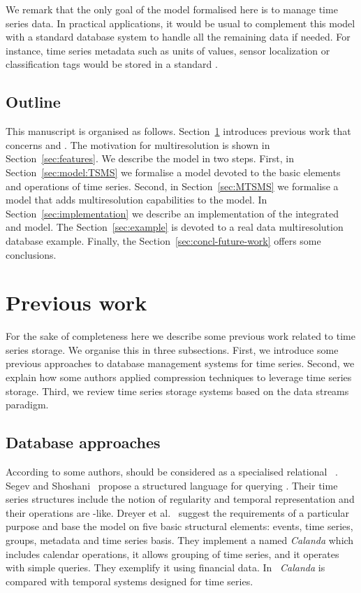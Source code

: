 We remark that the only goal of the model formalised here is to manage
time series data. In practical applications, it would be usual to
complement this model with a standard database system to handle all
the remaining data if needed. For instance, time series metadata such
as units of values, sensor localization or classification tags would
be stored in a standard .

\subsection{Outline}

This manuscript is organised as
follows. Section~\ref{sec:related-work} introduces previous work that
concerns  and .  The motivation for
multiresolution is shown in Section~\ref{sec:features}.  We describe
the model in two steps.  First, in Section~\ref{sec:model:TSMS} we
formalise a  model devoted to the basic elements and
operations of time series.  Second, in Section~\ref{sec:MTSMS} we
formalise a  model that adds multiresolution capabilities
to the  model.  In Section~\ref{sec:implementation} we
describe an implementation of the integrated  and
 model. The Section~\ref{sec:example} is devoted to a real
data multiresolution database example.  Finally,
the Section~\ref{sec:concl-future-work} offers some conclusions.


\section{Previous work}
\label{sec:related-work}

For the sake of completeness here we describe some previous work
related to time series storage. We organise this in three
subsections. First, we introduce some previous approaches to database
management systems for time series. Second, we explain how some
authors applied compression techniques to leverage time series
storage. Third, we review time series storage systems based on the
data streams paradigm.


\subsection{Database approaches}

According to some authors,  should be considered as a
specialised relational ~\cite{last01}.  Segev and
Shoshani~\cite{segev87:sigmod} propose a structured language for
querying . Their time series structures include the notion
of regularity and temporal representation and their operations are
-like.  Dreyer et al.~\cite{dreyer94} suggest the
requirements of a particular purpose  and base the model on
five basic structural elements: events, time series, groups, metadata
and time series basis. They implement a  named
\emph{Calanda} which includes calendar operations, it allows grouping
of time series, and it operates with simple queries. They exemplify it
using financial data. In~\cite{schmidt95} \emph{Calanda} is compared
with temporal systems designed for time series.
 
